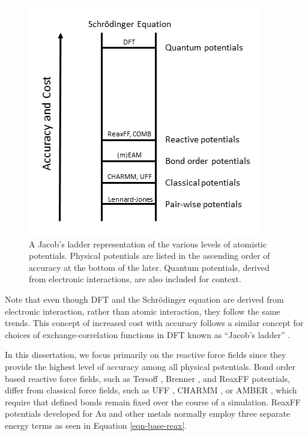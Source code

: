 \documentclass[12pt,oneside]{cmuthesis}
\begin{document}
\begin{figure}[h]
\centering
\includegraphics[width=4in]{./images/fig-jacobs-ladder.png}
\caption{A Jacob's ladder representation of the various levels of atomistic potentials. Physical potentials are listed in the ascending order of accuracy at the bottom of the later. Quantum potentials, derived from electronic interactions, are also included for context. \label{fig-jacobs-ladder}}
\end{figure}

Note that even though DFT and the Schrödinger equation are derived from electronic interaction, rather than atomic interaction, they follow the same trends. This concept of increased cost with accuracy follows a similar concept for choices of exchange-correlation functions in DFT known as ``Jacob's ladder'' \cite{perdew-2005-presc-desig}.

In this dissertation, we focus primarily on the reactive force fields since they provide the highest level of accuracy among all physical potentials. Bond order based reactive force fields, such as Tersoff \cite{tersoff-1988-new}, Brenner \cite{brenner-1990-empir}, and ReaxFF \cite{nielson-2005-devel-reaxf,duin-2001-reaxf} potentials, differ from classical force fields, such as UFF \cite{casewit-1992-applic,rappe-1992-uff}, CHARMM \cite{brooks-1983-charm}, or AMBER \cite{cornell-1995-secon-gener,cornell-1996-secon-gener}, which require that defined bonds remain fixed over the course of a simulation. ReaxFF potentials developed for Au and other metals normally employ three separate energy terms as seen in Equation \ref{eqn-base-reax}. \cite{jarvi-2008-devel-reaxf,keith-2010-react-forcef,cabrera-trujillo-2015-theor}
\end{document}
